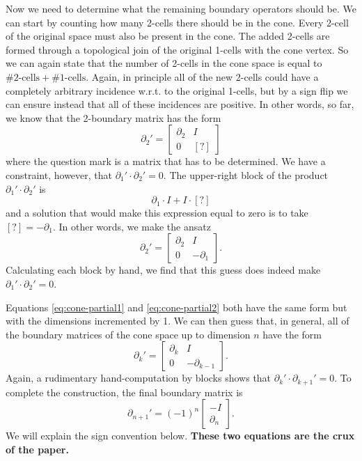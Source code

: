 \documentclass[twocolumn,leqno,twocolumn]{article}
\begin{document}
Now we need to determine what the remaining boundary operators should be.
We can start by counting how many 2-cells there should be in the cone.
Every 2-cell of the original space must also be present in the cone.
The added 2-cells are formed through a topological join of the original 1-cells with the cone vertex.
So we can again state that the number of 2-cells in the cone space is equal to $\#\text{2-cells} + \#\text{1-cells}$.
Again, in principle all of the new 2-cells could have a completely arbitrary incidence w.r.t. to the original 1-cells, but by a sign flip we can ensure instead that all of these incidences are positive.
In other words, so far, we know that the 2-boundary matrix has the form
\begin{equation}
    \partial_2' = \left[\begin{matrix}\partial_2 & I \\ 0 & [?]\end{matrix}\right]
\end{equation}
where the question mark is a matrix that has to be determined.
We have a constraint, however, that $\partial_1'\cdot\partial_2' = 0$.
The upper-right block of the product $\partial_1'\cdot\partial_2'$ is
\begin{equation}
    \partial_1\cdot I + I\cdot [?]
\end{equation}
and a solution that would make this expression equal to zero is to take $[?] = -\partial_1$.
In other words, we make the ansatz
\begin{equation}
    \partial_2' = \left[\begin{matrix}\partial_2 & I \\ 0 & -\partial_1\end{matrix}\right].
    \label{eq:cone-partial2}
\end{equation}
Calculating each block by hand, we find that this guess does indeed make $\partial_1'\cdot\partial_2' = 0$.

Equations \eqref{eq:cone-partial1} and \eqref{eq:cone-partial2} both have the same form but with the dimensions incremented by 1.
We can then guess that, in general, all of the boundary matrices of the cone space up to dimension $n$ have the form
\begin{equation}
    \partial_k' = \left[\begin{matrix}\partial_k & I \\ 0 & -\partial_{k - 1}\end{matrix}\right].
    \label{eq:cone-partial-k}
\end{equation}
Again, a rudimentary hand-computation by blocks shows that $\partial_k'\cdot\partial_{k + 1}' = 0$.
To complete the construction, the final boundary matrix is
\begin{equation}
    \partial_{n + 1}' = (-1)^n\left[\begin{matrix}-I \\ \partial_n\end{matrix}\right].
    \label{eq:cone-partial-n+1}
\end{equation}
We will explain the sign convention below.
\textbf{These two equations are the crux of the paper.}
\end{document}
